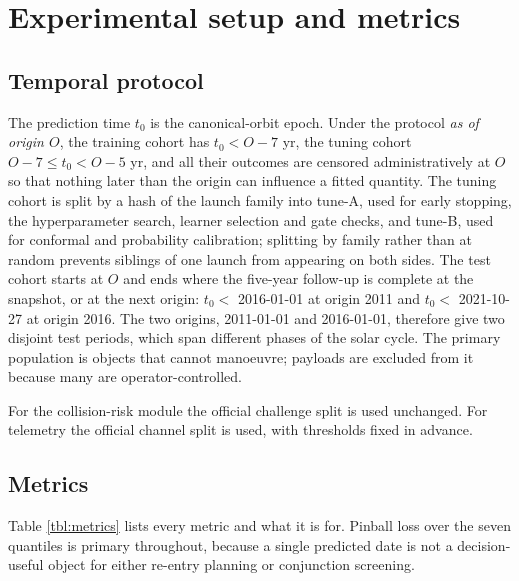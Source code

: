\documentclass[3p,times,twocolumn]{elsarticle}
\begin{document}
\section{Experimental setup and metrics}\label{sec:setup}

\subsection{Temporal protocol}\label{temporal-protocol}

The prediction time \(t_0\) is the canonical-orbit epoch. Under the
protocol \emph{as of origin \(O\)}, the training cohort has
\(t_0 < O - 7\) yr, the tuning cohort \(O - 7 \leq t_0 < O - 5\) yr, and
all their outcomes are censored administratively at \(O\) so that
nothing later than the origin can influence a fitted quantity. The
tuning cohort is split by a hash of the launch family into tune-A, used
for early stopping, the hyperparameter search, learner selection and
gate checks, and tune-B, used for conformal and probability calibration;
splitting by family rather than at random prevents siblings of one
launch from appearing on both sides. The test cohort starts at \(O\) and
ends where the five-year follow-up is complete at the snapshot, or at
the next origin: \(t_0 <\) 2016-01-01 at origin 2011 and \(t_0 <\)
2021-10-27 at origin 2016. The two origins, 2011-01-01 and 2016-01-01,
therefore give two disjoint test periods, which span different phases of
the solar cycle. The primary population is objects that cannot
manoeuvre; payloads are excluded from it because many are
operator-controlled.

For the collision-risk module the official challenge split is used
unchanged. For telemetry the official channel split is used, with
thresholds fixed in advance.

\subsection{Metrics}\label{metrics}

Table \ref{tbl:metrics} lists every metric and what it is for. Pinball
loss over the seven quantiles is primary throughout, because a single
predicted date is not a decision-useful object for either re-entry
planning or conjunction screening.
\end{document}
